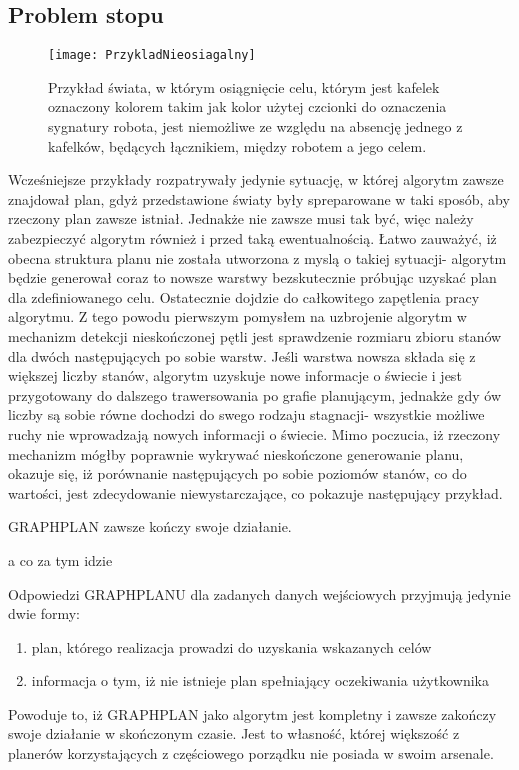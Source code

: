     \subsection{Problem stopu}
    \begin{figure}[H]
        \texttt{[image: PrzykladNieosiagalny]}
        \centering
        \caption{Przykład świata, w którym osiągnięcie celu, którym jest kafelek oznaczony kolorem takim jak kolor użytej czcionki do oznaczenia 
        sygnatury robota, jest niemożliwe ze względu na absencję jednego z kafelków, będących łącznikiem, między robotem a jego celem.}
        \label{PrzykladPlanW1}
    \end{figure}
    Wcześniejsze przykłady rozpatrywały jedynie sytuację, w której algorytm zawsze znajdował plan, gdyż przedstawione światy były spreparowane w taki sposób, 
    aby rzeczony plan zawsze istniał. Jednakże nie zawsze musi tak być, więc należy zabezpieczyć algorytm również i przed taką ewentualnością. Łatwo zauważyć, 
    iż obecna struktura planu nie została utworzona z myslą o takiej sytuacji- algorytm będzie generował coraz to nowsze warstwy bezskutecznie próbując uzyskać 
    plan dla zdefiniowanego celu. Ostatecznie dojdzie do całkowitego zapętlenia pracy algorytmu. 
    Z tego powodu pierwszym pomysłem na uzbrojenie algorytm w mechanizm detekcji nieskończonej pętli jest sprawdzenie rozmiaru zbioru stanów dla dwóch 
    następujących po sobie warstw. Jeśli warstwa nowsza składa się z większej liczby stanów, algorytm uzyskuje nowe informacje o świecie i jest 
    przygotowany do dalszego trawersowania po grafie planującym, jednakże gdy ów liczby są sobie równe dochodzi do swego rodzaju stagnacji- wszystkie 
    możliwe ruchy nie wprowadzają nowych informacji o świecie. Mimo poczucia, iż rzeczony mechanizm mógłby poprawnie wykrywać nieskończone generowanie 
    planu, okazuje się, iż porównanie następujących po sobie poziomów stanów, co do wartości, jest zdecydowanie niewystarczające, co pokazuje następujący 
    przykład.

    \begin{example}
        
    \end{example}

    \begin{corollary}
        GRAPHPLAN zawsze kończy swoje działanie.
    \end{corollary} 

    a co za tym idzie

    \begin{corollary}
        Odpowiedzi GRAPHPLANU dla zadanych danych wejściowych przyjmują jedynie dwie formy:
        \begin{enumerate}
            \item plan, którego realizacja prowadzi do uzyskania wskazanych celów
            \item informacja o tym, iż nie istnieje plan spełniający oczekiwania użytkownika
        \end{enumerate}
    \end{corollary}

    Powoduje to, iż GRAPHPLAN jako algorytm jest kompletny i zawsze zakończy swoje działanie w skończonym czasie. Jest to własność, której większość 
    z planerów korzystających z częściowego porządku nie posiada w swoim arsenale.


    


